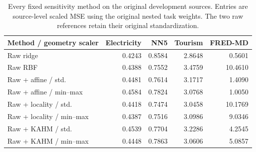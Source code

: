 \begin{table}[t]
\centering
\small
\begin{tabular}{lrrrr}
\toprule
Method / geometry scaler & Electricity & NN5 & Tourism & FRED-MD \\
\midrule
Raw ridge & 0.4243 & 0.8584 & 2.8648 & 0.5601 \\
Raw RBF & 0.4388 & 0.7552 & 3.4759 & 10.4610 \\
Raw + affine / std. & 0.4481 & 0.7614 & 3.1717 & 1.4090 \\
Raw + affine / min--max & 0.4584 & 0.7824 & 3.0768 & 1.0050 \\
Raw + locality / std. & 0.4418 & 0.7474 & 3.0458 & 10.1769 \\
Raw + locality / min--max & 0.4387 & 0.7516 & 3.0986 & 9.0346 \\
Raw + KAHM / std. & 0.4539 & 0.7704 & 3.2286 & 4.2545 \\
Raw + KAHM / min--max & 0.4448 & 0.7863 & 3.0606 & 5.0857 \\
\bottomrule
\end{tabular}
\caption{Every fixed sensitivity method on the original development sources. Entries are source-level scaled MSE using the original nested task weights. The two raw references retain their original standardization.}
\label{tab:scaling-all-sources-development}
\end{table}

